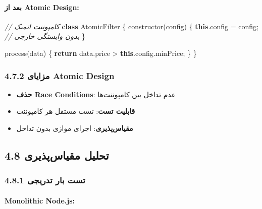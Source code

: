\documentclass[
]{article}
\newenvironment{Shaded}{}{}
\newcommand{\AttributeTok}[1]{\textcolor[rgb]{0.49,0.56,0.16}{#1}}
\newcommand{\BuiltInTok}[1]{\textcolor[rgb]{0.00,0.50,0.00}{#1}}
\newcommand{\CommentTok}[1]{\textcolor[rgb]{0.38,0.63,0.69}{\textit{#1}}}
\newcommand{\ControlFlowTok}[1]{\textcolor[rgb]{0.00,0.44,0.13}{\textbf{#1}}}
\newcommand{\FunctionTok}[1]{\textcolor[rgb]{0.02,0.16,0.49}{#1}}
\newcommand{\KeywordTok}[1]{\textcolor[rgb]{0.00,0.44,0.13}{\textbf{#1}}}
\newcommand{\NormalTok}[1]{#1}
\newcommand{\OperatorTok}[1]{\textcolor[rgb]{0.40,0.40,0.40}{#1}}
\providecommand{\tightlist}{%
  \setlength{\itemsep}{0pt}\setlength{\parskip}{0pt}}
\begin{document}
\paragraph{بعد از Atomic
Design:}\label{ux628ux639ux62f-ux627ux632-atomic-design}

\begin{Shaded}
\begin{Highlighting}[]
\CommentTok{// کامپوننت اتمیک}
\KeywordTok{class}\NormalTok{ AtomicFilter \{}
  \FunctionTok{constructor}\NormalTok{(config) \{}
    \KeywordTok{this}\OperatorTok{.}\AttributeTok{config} \OperatorTok{=}\NormalTok{ config}\OperatorTok{;} \CommentTok{// بدون وابستگی خارجی}
\NormalTok{  \}}

  \BuiltInTok{process}\NormalTok{(data) \{}
    \ControlFlowTok{return}\NormalTok{ data}\OperatorTok{.}\AttributeTok{price} \OperatorTok{\textgreater{}} \KeywordTok{this}\OperatorTok{.}\AttributeTok{config}\OperatorTok{.}\AttributeTok{minPrice}\OperatorTok{;}
\NormalTok{  \}}
\NormalTok{\}}
\end{Highlighting}
\end{Shaded}

\subsubsection{4.7.2 مزایای Atomic
Design}\label{ux645ux632ux627ux6ccux627ux6cc-atomic-design}

\begin{itemize}
\tightlist
\item
  \textbf{حذف Race Conditions}: عدم تداخل بین کامپوننت‌ها
\item
  \textbf{قابلیت تست}: تست مستقل هر کامپوننت
\item
  \textbf{مقیاس‌پذیری}: اجرای موازی بدون تداخل
\end{itemize}

\subsection{4.8 تحلیل
مقیاس‌پذیری}\label{ux62aux62dux644ux6ccux644-ux645ux642ux6ccux627ux633ux67eux630ux6ccux631ux6cc}

\subsubsection{4.8.1 تست بار
تدریجی}\label{ux62aux633ux62a-ux628ux627ux631-ux62aux62fux631ux6ccux62cux6cc}

\paragraph{Monolithic Node.js:}\label{monolithic-node.js}
\end{document}
